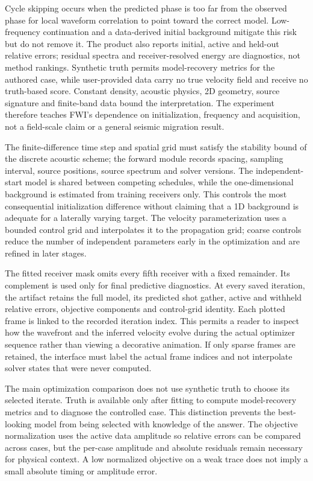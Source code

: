 Cycle skipping occurs when the predicted phase is too far from the
observed phase for local waveform correlation to point toward the
correct model. Low-frequency continuation and a data-derived initial
background mitigate this risk but do not remove it. The product also
reports initial, active and held-out relative errors; residual spectra
and receiver-resolved energy are diagnostics, not method rankings.
Synthetic truth permits model-recovery metrics for the authored case,
while user-provided data carry no true velocity field and receive no
truth-based score. Constant density, acoustic physics, 2D geometry,
source signature and finite-band data bound the interpretation. The
experiment therefore teaches FWI's dependence on initialization,
frequency and acquisition, not a field-scale claim or a general
seismic migration result.

The finite-difference time step and spatial grid must satisfy the
stability bound of the discrete acoustic scheme; the forward module
records spacing, sampling interval, source positions, source spectrum
and solver versions. The independent-start model is shared between
competing schedules, while the one-dimensional background is estimated
from training receivers only. This controls the most consequential
initialization difference without claiming that a 1D background is
adequate for a laterally varying target. The velocity parameterization
uses a bounded control grid and interpolates it to the propagation grid;
coarse controls reduce the number of independent parameters early in
the optimization and are refined in later stages.

The fitted receiver mask omits every fifth receiver with a fixed
remainder. Its complement is used only for final predictive diagnostics.
At every saved iteration, the artifact retains the full model, its
predicted shot gather, active and withheld relative errors, objective
components and control-grid identity. Each plotted frame is linked to
the recorded iteration index. This permits a reader to inspect how the
wavefront and the inferred velocity evolve during the actual optimizer
sequence rather than viewing a decorative animation. If only sparse
frames are retained, the interface must label the actual frame indices
and not interpolate solver states that were never computed.

The main optimization comparison does not use synthetic truth to choose
its selected iterate. Truth is available only after fitting to compute
model-recovery metrics and to diagnose the controlled case. This
distinction prevents the best-looking model from being selected with
knowledge of the answer. The objective normalization uses the active
data amplitude so relative errors can be compared across cases, but the
per-case amplitude and absolute residuals remain necessary for physical
context. A low normalized objective on a weak trace does not imply a
small absolute timing or amplitude error.

